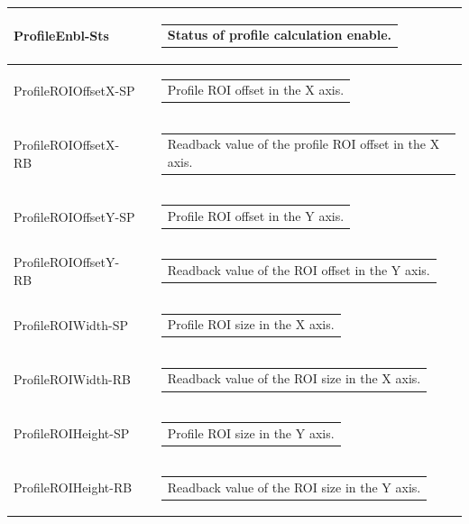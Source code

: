 \documentclass[openany]{article}
\begin{document}
\begin{longtable}{| m{3.0cm} m{4.5cm} m{7.0cm} |}
        ProfileEnbl-Sts &  & \begin{tabular}{@{}m{6cm}@{}}
                Status of profile calculation enable.
            \end{tabular} \hypertarget{}{}\\ \hline
        ProfileROIOffsetX-SP &  & \begin{tabular}{@{}m{6cm}@{}}
                Profile ROI offset in the X axis.
            \end{tabular} \\ \hline
        ProfileROIOffsetX-RB &  & \begin{tabular}{@{}m{6cm}@{}}
                Readback value of the profile ROI offset in the X axis.
            \end{tabular} \hypertarget{}{}\\ \hline
        ProfileROIOffsetY-SP &  & \begin{tabular}{@{}m{6cm}@{}}
                Profile ROI offset in the Y axis.
            \end{tabular} \\ \hline
        ProfileROIOffsetY-RB &  & \begin{tabular}{@{}m{6cm}@{}}
                Readback value of the ROI offset in the Y axis.
            \end{tabular} \hypertarget{}{}\\ \hline
        ProfileROIWidth-SP &  & \begin{tabular}{@{}m{6cm}@{}}
                Profile ROI size in the X axis.
            \end{tabular} \\ \hline
        ProfileROIWidth-RB &  & \begin{tabular}{@{}m{6cm}@{}}
                Readback value of the ROI size in the X axis.
            \end{tabular} \hypertarget{}{}\\ \hline
        ProfileROIHeight-SP &  & \begin{tabular}{@{}m{6cm}@{}}
                Profile ROI size in the Y axis.
            \end{tabular} \\ \hline
        ProfileROIHeight-RB &  & \begin{tabular}{@{}m{6cm}@{}}
                Readback value of the ROI size in the Y axis.

\end{tabular}
\end{longtable}
\end{document}
